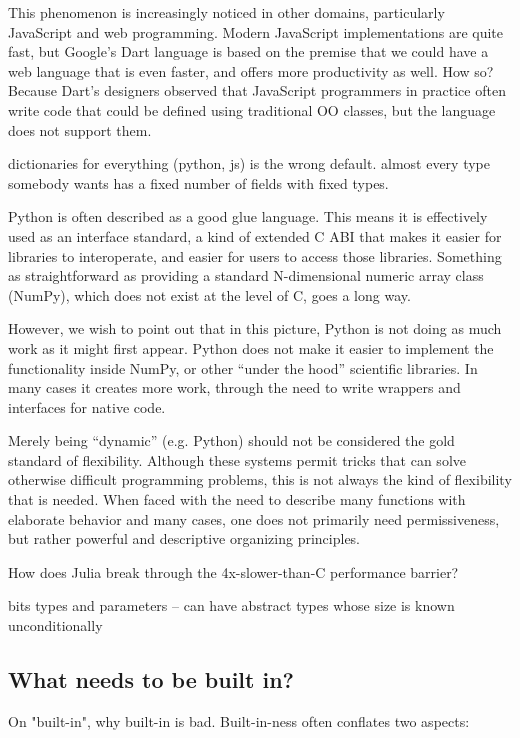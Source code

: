 This phenomenon is increasingly noticed in other domains, particularly
JavaScript and web programming. Modern JavaScript implementations are
quite fast, but Google's Dart language is based on the premise that
we could have a web language that is even faster, and offers more
productivity as well. How so? Because Dart's designers observed that
JavaScript programmers in practice often write code that could be
defined using traditional OO classes, but the language does not
support them.

dictionaries for everything (python, js) is the wrong default. almost every
type somebody wants has a fixed number of fields with fixed types.

Python is often described as a good glue language. This
means it is effectively used as an interface standard, a kind of
extended C ABI that makes it easier for libraries to interoperate,
and easier for users to access those libraries. Something as straightforward
as providing a standard N-dimensional numeric array class (NumPy),
which does not exist at the level of C, goes a long way.

However, we wish to point out that in this picture, Python is not
doing as much work as it might first appear. Python does not make
it easier to implement the functionality inside NumPy, or other
``under the hood'' scientific libraries. In many cases it creates
more work, through the need to write wrappers and interfaces
for native code.


Merely being ``dynamic'' (e.g. Python) should not be considered
the gold standard of flexibility. Although these systems permit
tricks that can solve otherwise difficult programming problems,
this is not always the kind of flexibility that is needed.
When faced with the need to describe many functions with elaborate
behavior and many cases, one does not primarily need permissiveness,
but rather powerful and descriptive organizing principles.



How does Julia break through the 4x-slower-than-C performance barrier?

bits types and parameters -- can have abstract types whose size is known
unconditionally




\subsection{What needs to be built in?}

On "built-in", why built-in is bad. Built-in-ness often conflates two
aspects:

